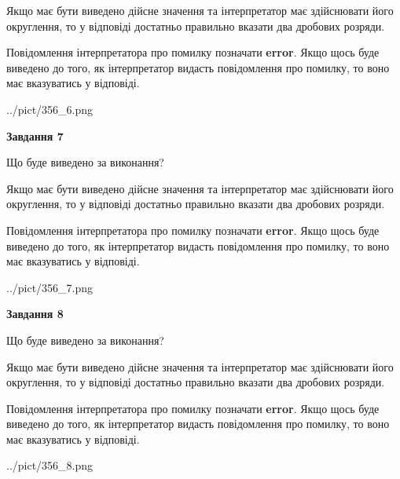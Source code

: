 \documentclass[12pt, ukrainian]{article}
\begin{document}
{\begin {Large}
Якщо має бути виведено дійсне значення та інтерпретатор має здійснювати його округлення, 
то у відповіді достатньо правильно вказати два дробових розряди.

Повідомлення інтерпретатора про помилку позначати \textbf{error}.
Якщо щось буде виведено до того, як інтерпретатор видасть повідомлення про помилку, 
то воно має вказуватись у відповіді. \par

\begin{center}
	{../pict/356_6.png}
\end{center}
\newpage

{\begin {center}\textbf{Завдання 7}\end {center}}\par
Що буде виведено за виконання? \par

Якщо має бути виведено дійсне значення та інтерпретатор має здійснювати його округлення, 
то у відповіді достатньо правильно вказати два дробових розряди.

Повідомлення інтерпретатора про помилку позначати \textbf{error}.
Якщо щось буде виведено до того, як інтерпретатор видасть повідомлення про помилку, 
то воно має вказуватись у відповіді. \par

\begin{center}
	{../pict/356_7.png}
\end{center}
\newpage

{\begin {center}\textbf{Завдання 8}\end {center}}\par
Що буде виведено за виконання? \par

Якщо має бути виведено дійсне значення та інтерпретатор має здійснювати його округлення, 
то у відповіді достатньо правильно вказати два дробових розряди.

Повідомлення інтерпретатора про помилку позначати \textbf{error}.
Якщо щось буде виведено до того, як інтерпретатор видасть повідомлення про помилку, 
то воно має вказуватись у відповіді. \par

\begin{center}
	{../pict/356_8.png}
\end{center}
\newpage


\end{Large}}
\end{document}
